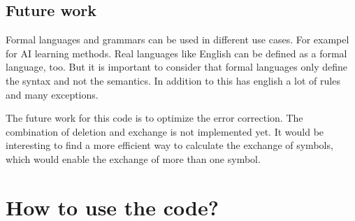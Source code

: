 \documentclass[a4paper, 11pt]{article}
\begin{document}
\subsection{Future work}

Formal languages and grammars can be used in different use cases. For exampel for AI learning methods. Real languages like English can be defined as a formal language, too. But it is important to consider that formal languages only define the syntax and not the semantics. In addition to this has english a lot of rules and many exceptions. \cite{FG}

The future work for this code is to optimize the error correction. The combination of deletion and exchange is not implemented yet. It would be interesting to find a more efficient way to calculate the exchange of symbols, which would enable the exchange of more than one symbol.




\newpage













\appendix

\section{How to use the code?}
\label{howtousethecode}
\end{document}
